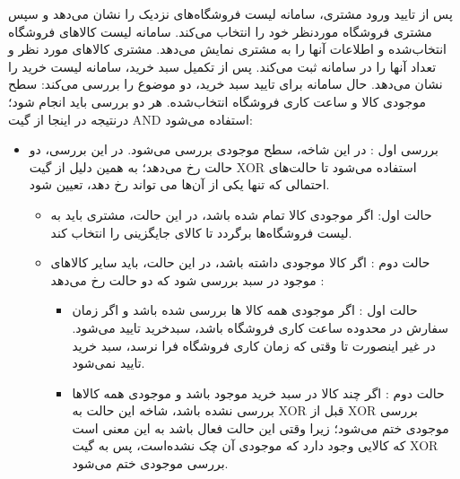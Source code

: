 \documentclass[14pt]{article}
\begin{document}
پس از تایید ورود مشتری، سامانه لیست فروشگاه‌های نزدیک را نشان می‌دهد و سپس مشتری فروشگاه موردنظر خود را انتخاب می‌کند. سامانه لیست کالاهای فروشگاه انتخاب‌شده و اطلاعات آنها را به مشتری نمایش می‌دهد. مشتری کالاهای مورد نظر و تعداد آنها را در سامانه ثبت می‌کند. پس از تکمیل سبد خرید، سامانه لیست خرید را نشان می‌دهد. حال سامانه برای تایید سبد خرید، دو موضوع را بررسی می‌کند: سطح موجودی کالا و ساعت کاری فروشگاه انتخاب‌شده. هر دو بررسی باید انجام شود؛ درنتیجه در اینجا از گیت AND استفاده می‌شود:\\
\begin{flushright}
\begin{itemize}
\item بررسی اول : در این شاخه، سطح موجودی بررسی می‌شود. در این بررسی، دو حالت رخ می‌دهد؛ به همین دلیل از گیت XOR  استفاده می‌شود تا حالت‌های احتمالی که تنها یکی از آن‌ها می تواند رخ دهد، تعیین شود.\\
\begin{flushright}
\begin{itemize}
\item حالت اول: اگر موجودی کالا تمام شده باشد، در این حالت، مشتری باید به لیست فروشگاه‌ها برگردد تا کالای جایگزینی را انتخاب کند. \\
\item حالت دوم : اگر کالا موجودی داشته‌ باشد، در این حالت، باید سایر کالاهای موجود در سبد بررسی شود که دو حالت رخ می‌دهد :\\
\begin{flushright}
\begin{itemize}
 \item حالت اول : اگر موجودی همه کالا ها بررسی شده باشد و اگر زمان سفارش در محدوده ساعت کاری فروشگاه باشد، سبدخرید تایید می‌شود. در غیر اینصورت تا وقتی که زمان کاری فروشگاه فرا نرسد، سبد خرید تایید نمی‌شود.\\
\item حالت دوم : اگر چند کالا در سبد خرید موجود باشد و موجودی همه کالاها بررسی نشده باشد، شاخه این حالت به XOR قبل از XOR بررسی موجودی ختم می‌شود؛ زیرا وقتی این حالت فعال باشد به این معنی است که کالایی وجود دارد که موجودی آن چک نشده‌است، پس به گیت XOR بررسی موجودی ختم می‌شود.\\

\end{itemize}
\end{flushright}
\end{itemize}
\end{flushright}


\end{itemize}
\end{flushright}
\end{document}
